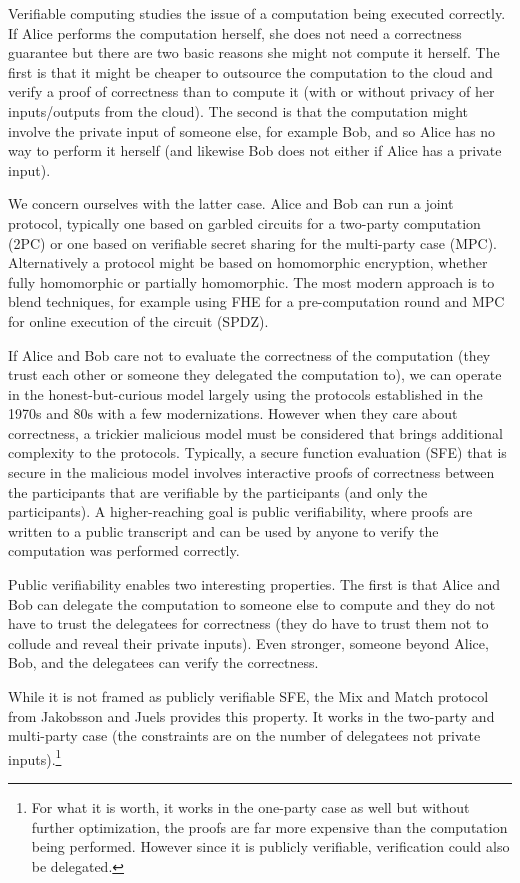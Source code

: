 Verifiable computing studies the issue of a computation being executed correctly. If Alice performs the computation herself, she does not need a correctness guarantee but there are two basic reasons she might not compute it herself. The first is that it might be cheaper to outsource the computation to the cloud and verify a proof of correctness than to compute it (with or without privacy of her inputs/outputs from the cloud). The second is that the computation might involve the private input of someone else, for example Bob, and so Alice has no way to perform it herself (and likewise Bob does not either if Alice has a private input).

We concern ourselves with the latter case. Alice and Bob can run a joint protocol, typically one based on garbled circuits for a two-party computation (2PC) or one based on verifiable secret sharing for the multi-party case (MPC). Alternatively a protocol might be based on homomorphic encryption, whether fully homomorphic or partially homomorphic. The most modern approach is to blend techniques, for example using FHE for a pre-computation round and MPC for online execution of the circuit (SPDZ).

If Alice and Bob care not to evaluate the correctness of the computation (they trust each other or someone they delegated the computation to), we can operate in the honest-but-curious model largely using the protocols established in the 1970s and 80s with a few modernizations. However when they care about correctness, a trickier malicious model must be considered that brings additional complexity to the protocols. Typically, a secure function evaluation (SFE) that is secure in the malicious model involves interactive proofs of correctness between the participants that are verifiable by the participants (and only the participants). A higher-reaching goal is public verifiability, where proofs are written to a public transcript and can be used by anyone to verify the computation was performed correctly.

Public verifiability enables two interesting properties. The first is that Alice and Bob can delegate the computation to someone else to compute and they do not have to trust the delegatees for correctness (they do have to trust them not to collude and reveal their private inputs). Even stronger, someone beyond Alice, Bob, and the delegatees can verify the correctness.

While it is not framed as publicly verifiable SFE, the Mix and Match protocol from Jakobsson and Juels provides this property. It works in the two-party and multi-party case (the constraints are on the number of delegatees not private inputs).\footnote{For what it is worth, it works in the one-party case as well but without further optimization, the proofs are far more expensive than the computation being performed. However since it is publicly verifiable, verification could also be delegated.}

